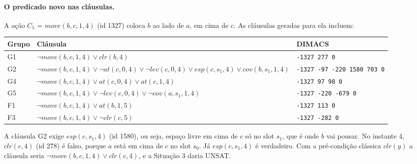 \documentclass[11pt,a4paper]{article}
\newcommand{\clr}{\mathit{clr}}
\newcommand{\at}{\mathit{at}}
\newcommand{\lev}{\mathit{lev}}
\newcommand{\cov}{\mathit{cov}}
\newcommand{\esp}{\mathit{esp}}
\newcommand{\mv}{\mathit{move}}
\begin{document}
\paragraph{O predicado novo nas cláusulas.} A ação $C_5$ = $\mv(b,c,1,4)$ (id 1327) coloca
$b$ ao lado de $a$, em cima de $c$. As cláusulas geradas para ela incluem:
\begin{center}\footnotesize
\begin{tabular}{@{}lll@{}}
\toprule
Grupo & Cláusula & DIMACS\\
\midrule
G1 & $\lnot \mv(b,c,1,4)\lor\clr(b,4)$ & \texttt{-1327 277 0}\\
G2 & $\lnot \mv(b,c,1,4)\lor\lnot\at(c,0,4)\lor\lnot\lev(c,0,4)\lor\esp(c,s_1,4)\lor\cov(b,s_1,1,4)$ & \texttt{-1327 -97 -220 1580 703 0}\\
G4 & $\lnot \mv(b,c,1,4)\lor\at(c,0,4)\lor\at(c,1,4)$ & \texttt{-1327 97 98 0}\\
G5 & $\lnot \mv(b,c,1,4)\lor\lnot\lev(c,0,4)\lor\lnot\cov(a,s_1,1,4)$ & \texttt{-1327 -220 -679 0}\\
F1 & $\lnot \mv(b,c,1,4)\lor\at(b,1,5)$ & \texttt{-1327 113 0}\\
F3 & $\lnot \mv(b,c,1,4)\lor\lnot\clr(c,5)$ & \texttt{-1327 -282 0}\\
\bottomrule
\end{tabular}
\end{center}
A cláusula G2 exige $\esp(c,s_1,4)$ (id 1580), ou seja, espaço livre em cima de $c$
só no slot $s_1$, que é onde $b$ vai pousar. No instante 4, $\clr(c,4)$ (id 278) é
falso, porque $a$ está em cima de $c$ no slot $s_0$. Já $\esp(c,s_1,4)$ é
verdadeiro. Com a pré-condição clássica $\clr(y)$ a cláusula seria
$\lnot \mv(b,c,1,4)\lor\clr(c,4)$, e a Situação 3 daria UNSAT.

\end{document}
